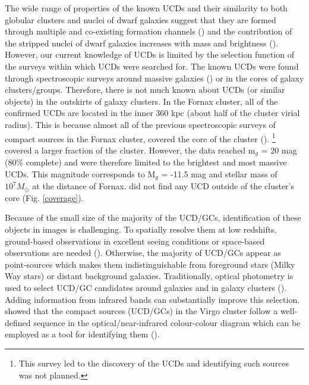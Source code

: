 \documentclass[fleqn,usenatbib]{mnras}
\begin{document}
The wide range of properties of the known UCDs and their similarity to both globular clusters and nuclei of dwarf galaxies suggest that they are formed through multiple and co-existing formation channels (\citealp{Francis-2012,Norris-2015}) and the contribution of the stripped nuclei of dwarf galaxies increases with mass and brightness (\citealp{Brodie-2011,Pfeffer-2016,mayes}). However, our current knowledge of UCDs is limited by the selection function of the surveys within which UCDs were searched for. The known UCDs were found through spectroscopic surveys around massive galaxies (\citealp{Norris-2014}) or in the cores of galaxy clusters/groups. Therefore, there is not much known about UCDs (or similar objects) in the outskirts of galaxy clusters. In the Fornax cluster, all of the confirmed UCDs are located in the inner 360 kpc (about half of the cluster virial radius). This is because almost all of the previous spectroscopic surveys of compact sources in the Fornax cluster, covered the core of the cluster (\citealp{Hilker-1999,Mieske2004,bergond2007,firth2007,firth2008,gregg2009,schuberth2010,Pota-2018}). \citet{drinkwater2000}\footnote{This survey led to the discovery of the UCDs and identifying such sources was not planned.} covered a larger fraction of the cluster. However, the data reached m$_g$ = 20 mag (80\% complete) and were therefore limited to the brightest and most massive UCDs. This magnitude corresponds to M$_g$ = -11.5 mag and stellar mass of $10^7 M_{\odot}$ at the distance of Fornax. \citet{drinkwater2000} did not find any UCD outside of the cluster's core (Fig. \ref{coverage}).

Because of the small size of the majority of the UCD/GCs, identification of these objects in images is challenging. To spatially resolve them at low redshifts, ground-based observations in excellent seeing conditions or space-based observations are needed (\citealp{richtler2005,mark,jordan2015,voggel-2016}). Otherwise, the majority of UCD/GCs appear as point-sources which makes them indistinguishable from foreground stars (Milky Way stars) or distant background galaxies. Traditionally, optical photometry is used to select UCD/GC candidates around galaxies and in galaxy clusters (\citealp{taylor2016,mlgc,prole2019,Cantiello2020}). Adding information from infrared bands can substantially improve this selection. \citet{Munoz-2014} showed that the compact sources (UCD/GCs) in the Virgo cluster follow a well-defined sequence in the optical/near-infrared colour-colour diagram which can be employed as a tool for identifying them (\citealp{Liu-2015,Powalka-2017,Cantiello2018,gonz2019,Liu-2020}). 
\end{document}
